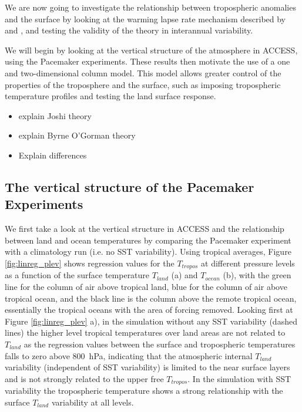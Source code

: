 We are now going to investigate the relationship between tropospheric anomalies 
and the surface by looking at the warming lapse rate mechanism described by 
\citet{Joshi2007} and \citet{Byrne2013a}, and testing the validity of the theory 
in interannual variability. 

We will begin by looking at the vertical structure of the atmosphere in ACCESS, 
using the Pacemaker experiments. These results then motivate the use of a one 
and two-dimensional column model. This model allows greater control of the 
properties of the troposphere and the surface, such as imposing tropospheric 
temperature profiles and testing the land surface response.

\begin{itemize}
	\item explain Joshi theory
	\item explain Byrne O'Gorman theory
	\item Explain differences
\end{itemize}


\subsection{The vertical structure of the Pacemaker Experiments}

We first take a look at the vertical structure in ACCESS and the relationship 
between land and ocean temperatures by comparing the Pacemaker experiment with a 
climatology run (i.e. no SST variability).  Using tropical averages, Figure 
\ref{fig:linreg_plev} shows regression values for the $T_{tropos}$ at different 
pressure levels as a function of the surface temperature $T_{land}$ (a) and 
$T_{ocean}$ (b), with the green line for the column of air above tropical land, 
blue for the column of air above tropical ocean, and the black line is the 
column above the remote tropical ocean, essentially the tropical oceans with the 
area of forcing removed.  Looking first at Figure \ref{fig:linreg_plev} a), in 
the simulation without any SST variability (dashed lines) the higher level 
tropical temperatures over land areas are not related to $T_{land}$ as the 
regression values between the surface and tropospheric temperatures falls to 
zero above \SI{800}{\hecto\pascal}, indicating that the atmospheric internal 
$T_{land}$ variability (independent of SST variability) is limited to the near 
surface layers and is not strongly related to the upper free $T_{tropos}$. In 
the simulation with SST variability the tropospheric temperature shows a strong 
relationship with the surface $T_{land}$ variability at all levels. 

